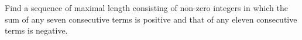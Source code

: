 Find a sequence of maximal length consisting of non-zero integers in which the sum of any seven consecutive terms is positive and that of any eleven consecutive terms is negative.
